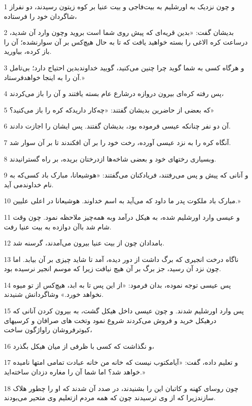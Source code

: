 \par 1 و چون نزدیک به اورشلیم به بیت‌فاجی و بیت عنیا بر کوه زیتون رسیدند، دو نفراز شاگردان خود را فرستاده،
\par 2 بدیشان گفت: «بدین قریه‌ای که پیش روی شما است بروید وچون وارد آن شدید، درساعت کره الاغی را بسته خواهید یافت که تا به حال هیچ‌کس بر آن سوارنشده؛ آن را باز کرده، بیاورید.
\par 3 و هرگاه کسی به شما گوید چرا چنین می‌کنید، گویید خداوندبدین احتیاج دارد؛ بی‌تامل آن را به اینجا خواهدفرستاد.»
\par 4 پس رفته کره‌ای بیرون دروازه درشارع عام بسته یافتند و آن را باز می‌کردند،
\par 5 که بعضی از حاضرین بدیشان گفتند: «چه‌کار داریدکه کره را باز می‌کنید؟»
\par 6 آن دو نفر چنانکه عیسی فرموده بود، بدیشان گفتند. پس ایشان را اجازت دادند.
\par 7 آنگاه کره را به نزد عیسی آورده، رخت خود را بر آن افکندند تا بر آن سوار شد.
\par 8 وبسیاری رختهای خود و بعضی شاخه‌ها ازدرختان بریده، بر راه گسترانیدند.
\par 9 و آنانی که پیش و پس می‌رفتند، فریادکنان می‌گفتند: «هوشیعانا، مبارک باد کسی‌که به نام خداوندمی آید.
\par 10 مبارک باد ملکوت پدر ما داود که می‌آید به اسم خداوند. هوشیعانا در اعلی علیین.»
\par 11 و عیسی وارد اورشلیم شده، به هیکل درآمد وبه همه‌چیز ملاحظه نمود. چون وقت شام شد باآن دوازده به بیت عنیا رفت.
\par 12 بامدادان چون از بیت عنیا بیرون می‌آمدند، گرسنه شد.
\par 13 ناگاه درخت انجیری که برگ داشت از دور دیده، آمد تا شاید چیزی بر آن بیابد. اما چون نزد آن رسید، جز برگ بر آن هیچ نیافت زیرا که موسم انجیر نرسیده بود.
\par 14 پس عیسی توجه نموده، بدان فرمود: «از این پس تا به ابد، هیچ‌کس از تو میوه نخواهد خورد.» وشاگردانش شنیدند.
\par 15 پس وارد اورشلیم شدند. و چون عیسی داخل هیکل گشت، به بیرون کردن آنانی که درهیکل خرید و فروش می‌کردند شروع نمود وتخت های صرافان و کرسیهای کبوترفروشان راواژگون ساخت،
\par 16 و نگذاشت که کسی با ظرفی از میان هیکل بگذرد،
\par 17 و تعلیم داده، گفت: «آیامکتوب نیست که خانه من خانه عبادت تمامی امتها نامیده خواهد شد؟ اما شما آن را مغاره دزدان ساخته‌اید.»
\par 18 چون روسای کهنه و کاتبان این را بشنیدند، در صدد آن شدند که او را چطور هلاک سازندزیرا که از وی ترسیدند چون که همه مردم ازتعلیم وی متحیر می‌بودند.
